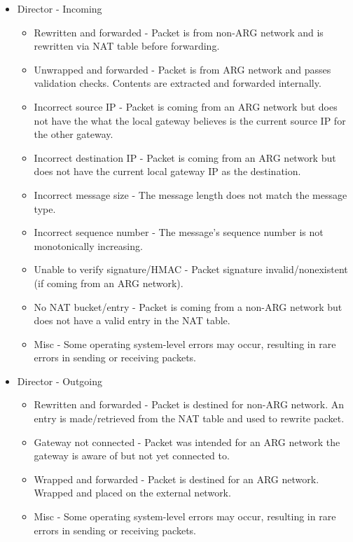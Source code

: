 \begin{itemize}
\item Director - Incoming
	\begin{itemize}
	\item Rewritten and forwarded - Packet is from non-\ac{ARG} network and is rewritten via \ac{NAT} table before forwarding.
	\item Unwrapped and forwarded - Packet is from \ac{ARG} network and passes validation checks. Contents are extracted and forwarded internally.

	\item Incorrect source \ac{IP} - Packet is coming from an \ac{ARG} network but does not have the what the local gateway believes is the current source IP for the other gateway.
	\item Incorrect destination \ac{IP} - Packet is coming from an \ac{ARG} network but does not have the current local gateway \ac{IP} as the destination.
	\item Incorrect message size - The message length does not match the message type.
	\item Incorrect sequence number - The message's sequence number is not monotonically increasing. 
	\item Unable to verify signature/\ac{HMAC} - Packet signature invalid/nonexistent (if coming from an \ac{ARG} network).
	\item No \ac{NAT} bucket/entry - Packet is coming from a non-\ac{ARG} network but does not have a valid entry in the \ac{NAT} table.

	\item Misc - Some operating system-level errors may occur, resulting in rare errors in sending or receiving packets.
	\end{itemize}

\item Director - Outgoing
	\begin{itemize}
	\item Rewritten and forwarded - Packet is destined for non-\ac{ARG} network. An entry is made/retrieved from the \ac{NAT} table and used to rewrite packet.

	\item Gateway not connected - Packet was intended for an ARG network the gateway is aware of but not yet connected to.
	\item Wrapped and forwarded - Packet is destined for an \ac{ARG} network. Wrapped and placed on the external network.

	\item Misc - Some operating system-level errors may occur, resulting in rare errors in sending or receiving packets.
	\end{itemize}
\end{itemize}

